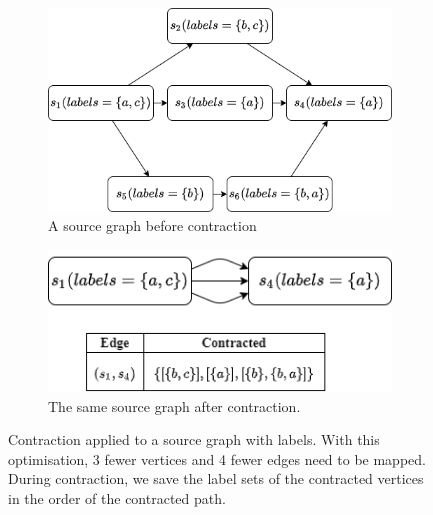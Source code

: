 \begin{figure}[H]
\begin{subfigure}{.55\textwidth}
  \centering
\includegraphics[scale=0.5]{images/contraction/after2.png}
  \caption{A source graph before contraction}
\end{subfigure}
\begin{subfigure}{.45\textwidth}
  \centering
\includegraphics[scale=0.6]{images/contraction/before2.png}
  \caption{The same source graph after contraction.}
\end{subfigure}
\caption{Contraction applied to a source graph with labels. With this optimisation, 3 fewer vertices and 4 fewer edges need to be mapped. During contraction, we save the label sets of the contracted vertices in the order of the contracted path.}
\label{fig:contraction}
\end{figure}


